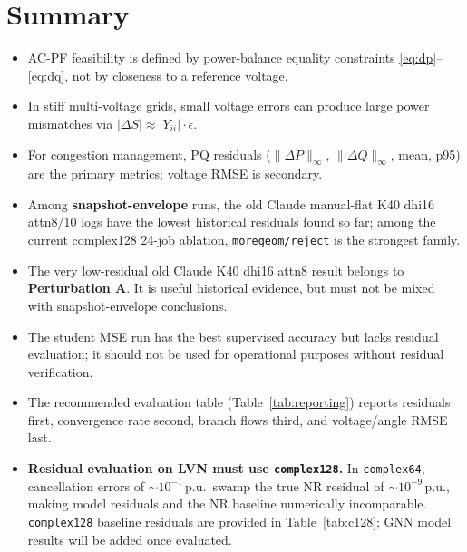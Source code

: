 \documentclass{article}
\begin{document}
\section{Summary}

\begin{itemize}[noitemsep]
  \item AC-PF feasibility is defined by power-balance equality constraints
    \eqref{eq:dp}--\eqref{eq:dq}, not by closeness to a reference voltage.
  \item In stiff multi-voltage grids, small voltage errors can produce large
    power mismatches via $|\Delta S| \approx |Y_{ii}| \cdot \epsilon$.
  \item For congestion management, PQ residuals ($\|\Delta P\|_\infty$,
    $\|\Delta Q\|_\infty$, mean, p95) are the primary metrics; voltage
    RMSE is secondary.
  \item Among \textbf{snapshot-envelope} runs, the old Claude manual-flat
    K40 dhi16 attn8/10 logs have the lowest historical residuals found so
    far; among the current complex128 24-job ablation, \texttt{moregeom/reject}
    is the strongest family.
  \item The very low-residual old Claude K40 dhi16 attn8 result belongs to
    \textbf{Perturbation A}.  It is useful historical evidence, but must not
    be mixed with snapshot-envelope conclusions.
  \item The student MSE run has the best supervised accuracy but lacks
    residual evaluation; it should not be used for operational purposes
    without residual verification.
  \item The recommended evaluation table (Table~\ref{tab:reporting}) reports
    residuals first, convergence rate second, branch flows third, and
    voltage/angle RMSE last.
  \item \textbf{Residual evaluation on LVN must use \texttt{complex128}.}
    In \texttt{complex64}, cancellation errors of $\sim10^{-1}$\,p.u.\
    swamp the true NR residual of $\sim10^{-9}$\,p.u., making model
    residuals and the NR baseline numerically incomparable.
    \texttt{complex128} baseline residuals are provided in
    Table~\ref{tab:c128}; GNN model results will be added once evaluated.
\end{itemize}
\end{document}

